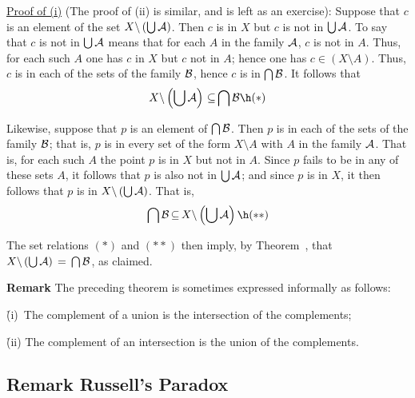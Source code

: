         \underline{Proof of (i)} (The proof of (ii) is similar, and is left as an exercise): Suppose that $c$ is an element of the set $X{\setminus}\left({\bigcup}\, {\cal A}\right)$.
	Then $c$ is in $X$ but $c$ is not in ${\bigcup}\,{\cal A}$.
    To say that $c$ is not in ${\bigcup}\,{\cal A}$ means that for each $A$ in the family ${\cal A}$, $c$ is not in $A$.
	Thus, for each such $A$ one has $c$ in $X$ but $c$ not in $A$;
    hence one has $c{\in}(X{\setminus}A)$.
    Thus, $c$ is in each of the sets of the family ${\cal B}$, hence $c$ is in ${\bigcap}\,{\cal B}$.
	It follows that
        \begin{displaymath}
        X{\setminus}\left({\bigcup}\, {\cal A}\right) \,{\subseteq}\, {\bigcap}\,{\cal B} \h ({\ast})
        \end{displaymath}

		Likewise, suppose that $p$ is an element of ${\bigcap}\,{\cal B}$.
    Then $p$ is in each of the sets of the family ${\cal B}$;
    that is, $p$ is in every set of the form $X{\setminus}A$ with $A$ in the family ${\cal A}$.
    That is, for each such $A$ the point $p$ is in $X$ but not in $A$.
    Since $p$ fails to be in any of these sets $A$, it follows that $p$ is also not in ${\bigcup}\,{\cal A}$;
    and since $p$ is in $X$, it then follows that $p$ is in $X{\setminus}\left({\bigcup}\,{\cal A}\right)$.
    That is,
        \begin{displaymath}
        {\bigcap}\,{\cal B} \,{\subseteq}\, X{\setminus}\left({\bigcup}\, {\cal A}\right) \h ({\ast}{\ast})
        \end{displaymath}


        The set relations $({\ast})$ and $({\ast}{\ast})$ then imply, by Theorem~,
    that $ X{\setminus}\left({\bigcup}\, {\cal A}\right) \,=\, {\bigcap}\,{\cal B}$, as claimed.
    

\V

        {\bf Remark} The preceding theorem is sometimes expressed informally as follows:

        \h (i)\, The complement of a union is the intersection of the complements;

       \h (ii) The complement of an intersection is the union of the complements.


\VV

\V

        \subsection{\small{\bf Remark} Russell's Paradox}

